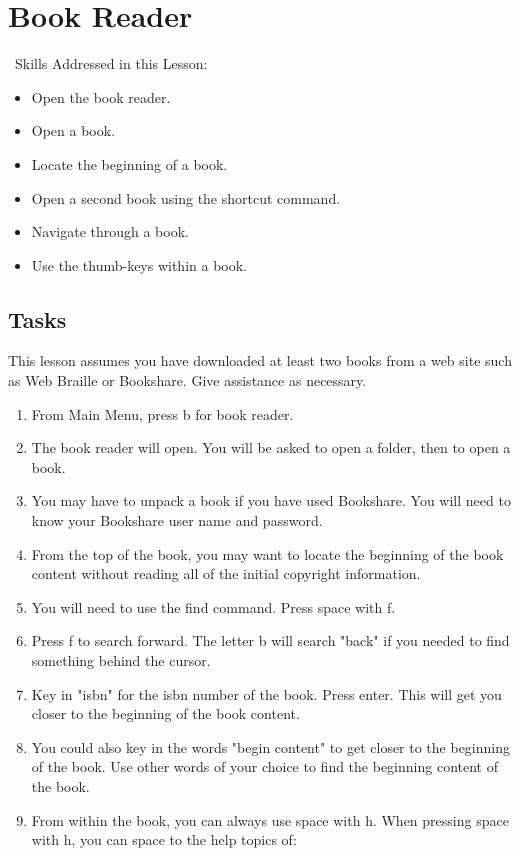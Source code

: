 \documentclass[10pt,letterpaper,twoside]{report}
\begin{document}
{{{\section{ Book Reader}
\
Skills Addressed in this Lesson:
\begin{itemize}
	\item Open the book reader.
	\item Open a book.
	\item Locate the beginning of a book.
	\item Open a second book using the shortcut command.
	\item Navigate through a book.
	\item Use the thumb-keys within a book.
\end{itemize}
\subsection{Tasks}
This lesson assumes you have downloaded at least two books from a web site such as Web Braille or Bookshare. Give assistance as necessary.
\begin{enumerate}
	\item From Main Menu, press b for book reader.
	\item The book reader will open.  You will be asked to open a folder, then to open a book.
	\item You may have to unpack a book if you have used Bookshare. You will need to know your Bookshare user name and password.
	\item From the top of the book, you may want to locate the beginning of the book content without reading all of the initial copyright information.
	\item You will need to use the find command.  Press space with f.
	\item Press f to search forward.  The letter b will search "back" if you needed to find something behind the cursor.
	\item Key in "isbn" for the isbn number of the book.  Press enter.  This will get you closer to the beginning of the book content.
	\item You could also key in the words "begin content" to get closer to the beginning of the book.  Use other words of your choice to find the beginning content of the book.
	\item From within the book, you can always use space with h.  When pressing space with h, you can space to the help topics of:
	      \begin{enumerate}

\end{enumerate}
\end{enumerate}}}}
\end{document}
